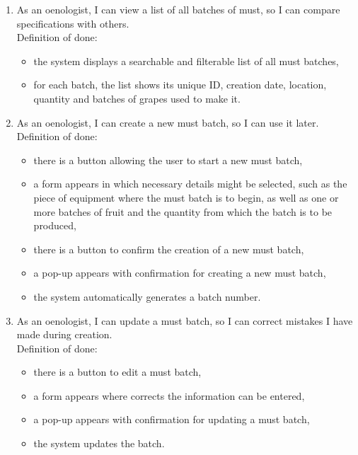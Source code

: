 \begin{enumerate}
	\begin{itemize}
		\item on task list there is button to mark task as completed or not completed,
	\end{itemize}
	\item As an oenologist, I can view a list of all batches of must, so I can compare specifications with others.
	\\Definition of done:
	\begin{itemize}
		\item the system displays a searchable and filterable list of all must batches,
		\item for each batch, the list shows its unique ID, creation date, location, quantity and batches of grapes used to make it.
	\end{itemize}
	\item As an oenologist, I can create a new must batch, so I can use it later.
	\\Definition of done:
	\begin{itemize}
		\item there is a button allowing the user to start a new must batch,
		\item a form appears in which necessary details might be selected, such as the piece of equipment where the must batch is to begin, as well as one or more batches of fruit and the quantity from which the batch is to be produced,
		\item there is a button to confirm the creation of a new must batch,
		\item a pop-up appears with confirmation for creating a new must batch,
		\item the system automatically generates a batch number.
	\end{itemize}
	\item As an oenologist, I can update a must batch, so I can correct mistakes I have made during creation.
	\\Definition of done:
	\begin{itemize}
		\item there is a button to edit a must batch,
		\item a form appears where corrects the information can be entered,
		\item a pop-up appears with confirmation for updating a must batch,
		\item the system updates the batch.

\end{itemize}
\end{enumerate}
